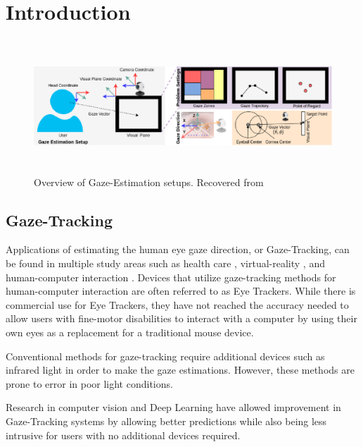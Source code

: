 
\chapter{Introduction}
\label{Chap1}

\begin{figure}
    \centering
    \includegraphics[width=\textwidth,height=5cm]{img/figures/gaze_estimation_setup.png}
    \caption[Overview of Gaze-Estimation setups]{Overview of Gaze-Estimation setups. Recovered from \cite{survey_automatic_gaze_ghosh}}
    \label{gaze_estimation_setup}
 \end{figure}


\section{Gaze-Tracking}
Applications of estimating the human eye gaze direction, or Gaze-Tracking, can be found in multiple study areas such as health care \cite{EyeTrackMedical}, virtual-reality \cite{EyeVR}, and human-computer interaction \cite{Gaze-Controlled-Web}. Devices that utilize gaze-tracking methods for human-computer interaction are often referred to as Eye Trackers. While there is commercial use for Eye Trackers, they have not reached the accuracy needed to allow users with fine-motor disabilities to interact with a computer by using their own eyes as a replacement for a traditional mouse device.

Conventional methods for gaze-tracking require additional devices such as infrared light in order to make the gaze estimations. However, these methods are prone to error in poor light conditions.

Research in computer vision and Deep Learning have allowed improvement in Gaze-Tracking systems by allowing better predictions while also being less intrusive for users with no additional devices required.



